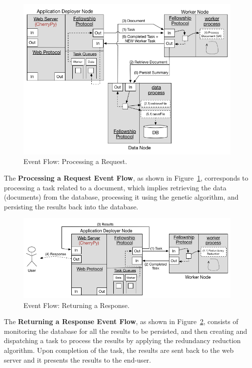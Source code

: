 \documentclass[12pt, titlepage]{uo_temp}
\begin{document}
     \begin{figure}[h!]
       \centering
       \includegraphics[width=125mm]{images/ef2.png}
       \caption{Event Flow: Processing a Request.}
       \label{ef2}
     \end{figure}

     The \textbf{Processing a Request Event Flow}, as shown in Figure~\ref{ef2},
     corresponds to processing a task related to a document, which implies retrieving the data
     (documents) from the database, processing it using the genetic algorithm, and persisting
     the results back into the database.

     \begin{figure}[h!]
       \centering
       \includegraphics[width=125mm]{images/ef3.png}
       \caption{Event Flow: Returning a Response.}
       \label{ef3}
     \end{figure}
     
     The \textbf{Returning a Response Event Flow}, as shown in Figure~\ref{ef3}, consists
     of monitoring the database for all the results to be persisted, and then creating and
     dispatching a task to process the results by applying the redundancy reduction
     algorithm. Upon completion of the task, the results are sent back to the web server
     and it presents the results to the end-user.
     
\end{document}
